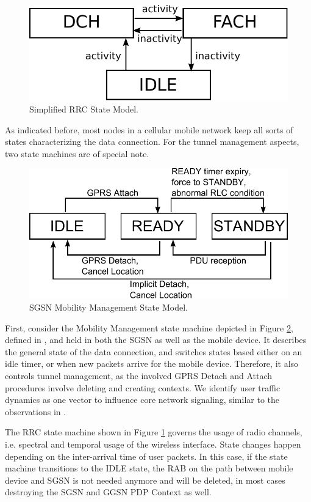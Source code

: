 \begin{figure}[htb]
	\centering
	\includegraphics[width=0.8\columnwidth]{images/rrc-simplified-state-model.pdf}
	\caption{Simplified \gls{RRC} State Model.}
	\label{c4:fig:rrcstatemodel}
\end{figure}


As indicated before, most nodes in a cellular mobile network keep all sorts of states characterizing the data connection. For the tunnel management aspects, two state machines are of special note.

\begin{figure}[htb]
	\centering
	\includegraphics[width=0.8\columnwidth]{images/mm-state-model.pdf}
	\caption{\gls{SGSN} Mobility Management State Model.}
	\label{c4:fig:mmstatemodel}
\end{figure}

First, consider the Mobility Management state machine depicted in Figure \ref{c4:fig:mmstatemodel}, defined in \cite{3gpp.23.060}, and held in both the \gls{SGSN} as well as the mobile device. It describes the general state of the data connection, and switches states based either on an idle timer, or when new packets arrive for the mobile device. Therefore, it also controls tunnel management, as the involved \gls{GPRS} Detach and Attach procedures involve deleting and creating contexts. We identify user traffic dynamics as one vector to influence core network signaling, similar to the observations in \cite{lee2007detection}.


The \gls{RRC} state machine shown in Figure \ref{c4:fig:rrcstatemodel} governs the usage of radio channels, i.e. spectral and temporal usage of the wireless interface. State changes happen depending on the inter-arrival time of user packets. In this case, if the state machine transitions to the IDLE state, the \gls{RAB} on the path between mobile device and \gls{SGSN} is not needed anymore and will be deleted, in most cases destroying the \gls{SGSN} and \gls{GGSN} \gls{PDP} Context as well.

